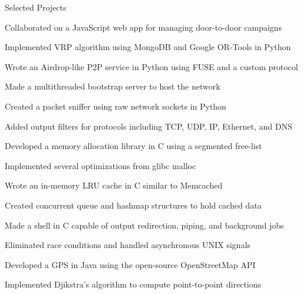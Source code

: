 \documentclass{cv}
\begin{document}
\begin{cvsection}{Selected Projects}
  {
    \item Collaborated on a JavaScript web app for managing door-to-door campaigns
    \item Implemented VRP algorithm using MongoDB and Google OR-Tools in Python
  }
  {
    \item Wrote an Airdrop-like P2P service in Python using FUSE and a custom protocol
    \item Made a multithreaded bootstrap server to host the network
  }
  {
    \item Created a packet sniffer using raw network sockets in Python
    \item Added output filters for protocols including TCP, UDP, IP, Ethernet, and DNS
  }
  {
    \item Developed a memory allocation library in C using a segmented free-list
    \item Implemented several optimizations from glibc malloc
  }
  {
    \item Wrote an in-memory LRU cache in C similar to Memcached
    \item Created concurrent queue and hashmap structures to hold cached data
  }
  {
    \item Made a shell in C capable of output redirection, piping, and background jobs
    \item Eliminated race conditions and handled asynchronous UNIX signals
  }
  {
    \item Developed a GPS in Java using the open-source OpenStreetMap API
    \item Implemented Djikstra's algorithm to compute point-to-point directions
  }
\end{cvsection}
\end{document}
